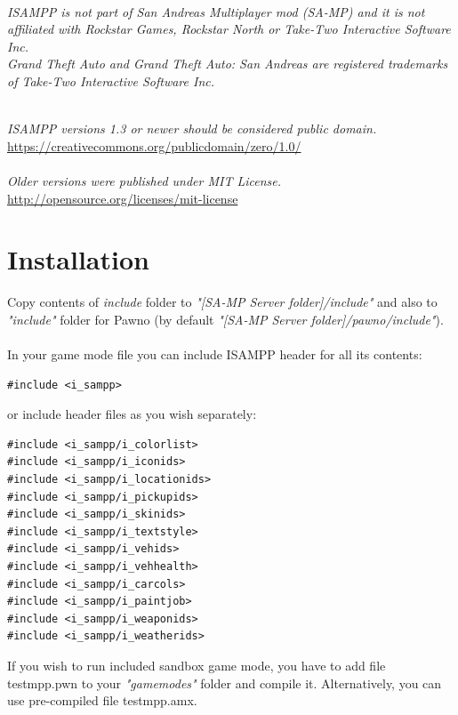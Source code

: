 \documentclass{article}
\begin{document}
\textit{\\ISAMPP is not part of San Andreas Multiplayer mod (SA-MP) and it is not affiliated with Rockstar Games, Rockstar North or Take-Two Interactive Software Inc.}
\textit{\\Grand Theft Auto and Grand Theft Auto: San Andreas are registered trademarks of Take-Two Interactive Software Inc.}

\textit{\\ISAMPP versions 1.3 or newer should be considered public domain.}
\\\url{https://creativecommons.org/publicdomain/zero/1.0/}
\\
\\\textit{Older versions were published under MIT License.}
\\\url{http://opensource.org/licenses/mit-license}

\section{Installation}
Copy contents of \textit{include} folder to \textit{"[SA-MP Server folder]/include"} and also to \textit{"include"} folder for Pawno (by default \textit{"[SA-MP Server folder]/pawno/include"}).
\\
\\
In your game mode file you can include ISAMPP header for all its contents:
\begin{verbatim}
#include <i_sampp>
\end{verbatim}
or include header files as you wish separately:
\begin{verbatim}
#include <i_sampp/i_colorlist>
#include <i_sampp/i_iconids>
#include <i_sampp/i_locationids>
#include <i_sampp/i_pickupids>
#include <i_sampp/i_skinids>
#include <i_sampp/i_textstyle>
#include <i_sampp/i_vehids>
#include <i_sampp/i_vehhealth>
#include <i_sampp/i_carcols>
#include <i_sampp/i_paintjob>
#include <i_sampp/i_weaponids>
#include <i_sampp/i_weatherids>
\end{verbatim}
If you wish to run included sandbox game mode, you have to add file testmpp.pwn to your \textit{"gamemodes"} folder and compile it. Alternatively, you can use pre-compiled file testmpp.amx.

\newpage
\end{document}
